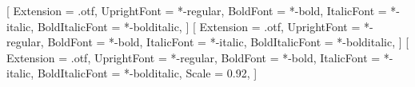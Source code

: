 %

\usepackage[fontsize=13pt]{fontsize}

\usepackage{anyfontsize}

\usepackage{geometry}
\geometry{
    a4paper,
    left=3.5cm,      %
    right=2.0cm,
    top=3.0cm,
    bottom=3.0cm,
    footskip=1.2cm
}

\usepackage{fontspec}

\setmainfont{texgyretermes}[
    Extension      = .otf,
    UprightFont    = *-regular,
    BoldFont       = *-bold,
    ItalicFont     = *-italic,
    BoldItalicFont = *-bolditalic,
]
\setsansfont{texgyreheros}[
    Extension      = .otf,
    UprightFont    = *-regular,
    BoldFont       = *-bold,
    ItalicFont     = *-italic,
    BoldItalicFont = *-bolditalic,
]
\setmonofont{texgyrecursor}[
    Extension      = .otf,
    UprightFont    = *-regular,
    BoldFont       = *-bold,
    ItalicFont     = *-italic,
    BoldItalicFont = *-bolditalic,
    Scale          = 0.92,
]

